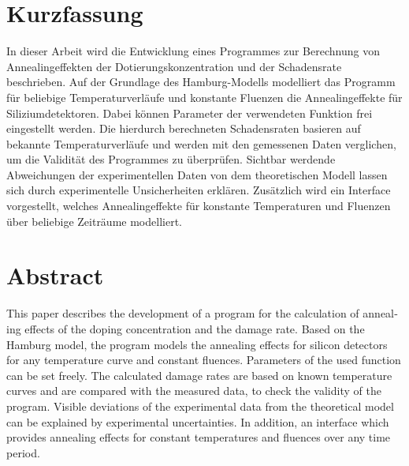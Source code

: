 \thispagestyle{plain}

\section*{Kurzfassung}
In dieser Arbeit wird die Entwicklung eines Programmes zur
Berechnung von Annealingeffekten der Dotierungskonzentration und der Schadensrate
beschrieben. Auf der Grundlage des Hamburg-Modells modelliert das Programm für beliebige
Temperaturverläufe und konstante Fluenzen die Annealingeffekte für Siliziumdetektoren.
Dabei können Parameter der verwendeten Funktion frei eingestellt werden.
Die hierdurch berechneten Schadensraten basieren auf bekannte Temperaturverläufe und werden mit den gemessenen Daten verglichen,
um die Validität des Programmes zu überprüfen. Sichtbar werdende Abweichungen der
experimentellen Daten von dem theoretischen Modell lassen sich durch experimentelle Unsicherheiten erklären.
Zusätzlich wird ein Interface vorgestellt, welches Annealingeffekte für konstante Temperaturen und Fluenzen
über beliebige Zeiträume modelliert.

\section*{Abstract}
\begin{english}
  This paper describes the development of a program for the calculation of annealing effects of the doping concentration and the damage rate.
  Based on the Hamburg model, the program models the annealing effects for silicon detectors for any temperature curve and constant fluences.
  Parameters of the used function can be set freely.
  The calculated damage rates are based on known temperature curves and are compared with the measured data,
  to check the validity of the program.
   Visible deviations of the experimental data from the theoretical model can be explained by experimental uncertainties. In addition, an interface which provides annealing effects for constant temperatures and fluences over any time period.



\end{english}

